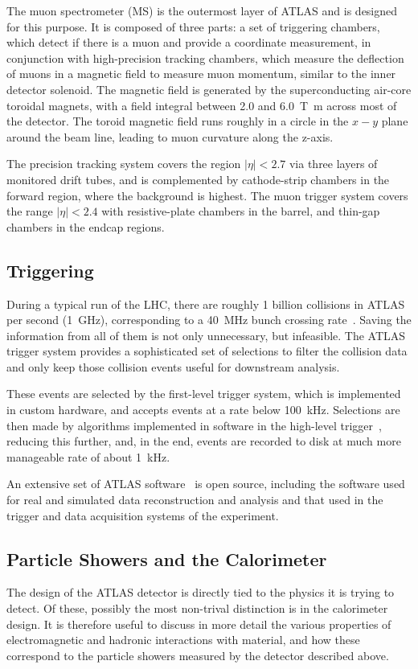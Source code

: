 The muon spectrometer (MS) is the outermost layer of ATLAS and is designed for this purpose. It is composed 
of three parts: a set of triggering chambers, which detect if there is a muon and provide 
a coordinate measurement, in conjunction with high-precision tracking chambers, which measure the deflection of 
muons in a magnetic field to measure muon momentum, similar to the inner detector solenoid. The magnetic 
field is generated by the superconducting air-core toroidal magnets, with a field integral between 
\num{2.0} and \SI{6.0}{\tesla\metre} across most of the detector. The toroid magnetic field runs roughly 
in a circle in the $x-y$ plane around the beam line, leading to muon curvature along the z-axis.

The precision tracking system covers the region \(|\eta| < 2.7\) via three layers of monitored drift 
tubes, and is complemented by cathode-strip chambers in the forward region, where the background is highest.
The muon trigger system covers the range \(|\eta| < 2.4\) with resistive-plate chambers in the barrel, and thin-gap chambers in the endcap regions.

\subsection{Triggering}
During a typical run of the LHC, there are roughly 1 billion collisions in ATLAS per second (\SI{1}{\GHz}), corresponding
to a \SI{40}{\MHz} bunch crossing rate~\cite{FactSheet}.
Saving the information from all of them is not only unnecessary, but infeasible. The ATLAS trigger 
system provides a sophisticated set of selections to filter the collision data and only keep those 
collision events useful for downstream analysis.

These events are selected by the first-level trigger system, which is implemented in custom hardware,
and accepts events at a rate below \SI{100}{\kHz}. Selections are then made by algorithms implemented in software 
in the high-level trigger~\cite{TRIG-2016-01}, reducing this further, and, in the end, events 
are recorded to disk at much more manageable rate of about \SI{1}{\kHz}.

An extensive set of ATLAS software~\cite{ATL-SOFT-PUB-2021-001} is open source, including the software used for real and simulated data reconstruction and analysis and that used in the trigger and data acquisition systems of the experiment.

\subsection{Particle Showers and the Calorimeter}
\label{sec:showering}
The design of the ATLAS detector is directly tied to the physics it is trying to detect. Of these, 
possibly the most non-trival distinction is in the calorimeter design. It is therefore useful to discuss in more 
detail the various properties of electromagnetic and hadronic interactions with material, and how these 
correspond to the particle showers measured by the detector described above. 

